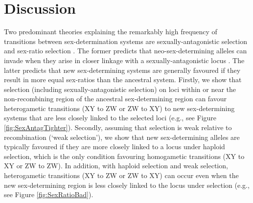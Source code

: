 \documentclass[12pt]{article}
\begin{document}
\section*{Discussion}



Two predominant theories explaining the remarkably high frequency of transitions between sex-determination systems are sexually-antagonistic selection and sex-ratio selection \citep[reviewed in][]{Blaser2012, vanDoorn2014re}.
The former predicts that neo-sex-determining alleles can invade when they arise in closer linkage with a sexually-antagonistic locus \citep{vanDoorn:2007eu,vanDoorn:2010hu}.
The latter predicts that new sex-determining systems are generally favoured if they result in more equal sex-ratios than the ancestral system. 
Firstly, we show that selection (including sexually-antagonistic selection) on loci within or near the non-recombining region of the ancestral sex-determining region can favour heterogametic transitions (XY to ZW or ZW to XY) to new sex-determining systems that are less closely linked to the selected loci (e.g., see Figure \ref{fig:SexAntagTighter}). 
Secondly, assuming that selection is weak relative to recombination (`weak selection'), we show that new sex-determining alleles are typically favoured if they are more closely linked to a locus under haploid selection, which is the only condition favouring homogametic transitions (XY to XY or ZW to ZW). 
In addition, with haploid selection and weak selection, heterogametic transitions (XY to ZW or ZW to XY) can occur even when the new sex-determining region is less closely linked to the locus under selection (e.g., see Figure \ref{fig:SexRatioBad}). 
\end{document}
